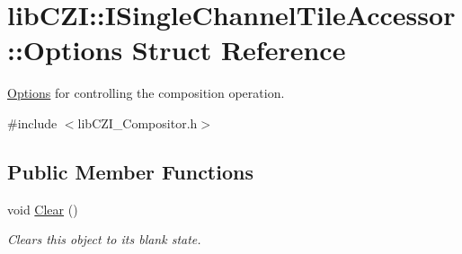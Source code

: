 \hypertarget{structlib_c_z_i_1_1_i_single_channel_tile_accessor_1_1_options}{}\section{lib\+C\+ZI\+:\+:I\+Single\+Channel\+Tile\+Accessor\+:\+:Options Struct Reference}
\label{structlib_c_z_i_1_1_i_single_channel_tile_accessor_1_1_options}


\hyperlink{structlib_c_z_i_1_1_i_single_channel_tile_accessor_1_1_options}{Options} for controlling the composition operation.  




{\ttfamily \#include $<$lib\+C\+Z\+I\+\_\+\+Compositor.\+h$>$}

\subsection*{Public Member Functions}
\begin{DoxyCompactItemize}
\item 
\mbox{\label{structlib_c_z_i_1_1_i_single_channel_tile_accessor_1_1_options_a8a71ed70115175973da1251e01ddf838}} 
void \hyperlink{structlib_c_z_i_1_1_i_single_channel_tile_accessor_1_1_options_a8a71ed70115175973da1251e01ddf838}{Clear} ()
\begin{DoxyCompactList}\small\item\em Clears this object to its blank state. \end{DoxyCompactList}\end{DoxyCompactItemize}
